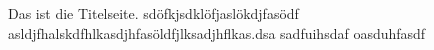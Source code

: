 
Das ist die Titelseite. sdöfkjsdklöfjaslökdjfasödf
asldjfhalskdfhlkasdjhfasöldfjlksadjhflkas.dsa sadfuihsdaf oasduhfasdf
